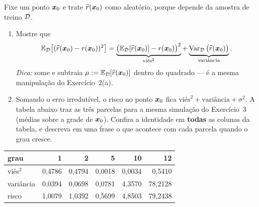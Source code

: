 \documentclass[11pt,a4paper]{article}
\begin{document}
\begin{exercicio}
Fixe um ponto $\bm{x}_0$ e trate $\widehat{r}(\bm{x}_0)$ como aleatório, porque depende da
amostra de treino $\mathcal{D}$.
\begin{enumerate}[label=(\alph*),leftmargin=1.1cm]
  \item Mostre que
        \[
          \mathbb{E}_{\mathcal{D}}\big[(\widehat{r}(\bm{x}_0)-r(\bm{x}_0))^2\big]
          = \underbrace{\big(\mathbb{E}_{\mathcal{D}}[\widehat{r}(\bm{x}_0)]-r(\bm{x}_0)\big)^2}_{\text{viés}^2}
          + \underbrace{\operatorname{Var}_{\mathcal{D}}\big(\widehat{r}(\bm{x}_0)\big)}_{\text{variância}}.
        \]
        \emph{Dica:} some e subtraia $\mu:=\mathbb{E}_{\mathcal{D}}[\widehat{r}(\bm{x}_0)]$ dentro do
        quadrado --- é a mesma manipulação do Exercício~2(a).
  \item Somando o erro irredutível, o risco no ponto $\bm{x}_0$ fica
        $\text{viés}^2+\text{variância}+\sigma^2$. A tabela abaixo traz as três
        parcelas para a mesma simulação do Exercício~3 (médias sobre a grade de
        $\bm{x}_0$). Confira a identidade em \textbf{todas} as colunas da tabela, e
        descreva em uma frase o que acontece com cada parcela quando o grau cresce.
\end{enumerate}

\begin{center}\small
\renewcommand{\arraystretch}{1.2}
\begin{tabular}{@{}lrrrrr@{}}
\toprule
grau & 1 & 2 & 5 & 10 & 12 \\
\midrule
viés$^2$    & 0{,}4786 & 0{,}4794 & 0{,}0018 & 0{,}0034 & 0{,}5410 \\
variância   & 0{,}0394 & 0{,}0698 & 0{,}0781 & 4{,}3570 & 78{,}2128 \\
risco       & 1{,}0079 & 1{,}0392 & 0{,}5699 & 4{,}8503 & 79{,}2438 \\
\bottomrule
\end{tabular}
\end{center}
\end{exercicio}
\end{document}
